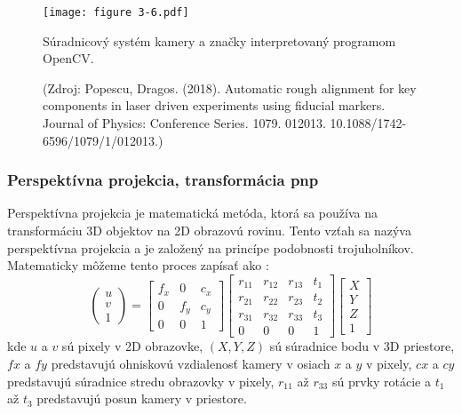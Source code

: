 {\begin{figure}[ht!]
    \centering
    \texttt{[image: figure 3-6.pdf]}
    \caption{Súradnicový systém kamery a značky interpretovaný programom OpenCV.}
    \captionsetup{font=footnotesize, justification=centering, skip=5pt}
    \caption*{(Zdroj: Popescu, Dragos. (2018). Automatic rough alignment for key components in laser driven experiments using fiducial markers. Journal of Physics: Conference Series. 1079. 012013. 10.1088/1742-6596/1079/1/012013.)}
    \label{o:3-6}
\end{figure}  

\subsubsection{Perspektívna projekcia, transformácia pnp}
Perspektívna projekcia je matematická metóda, ktorá sa používa na transformáciu 3D objektov na 2D obrazovú rovinu. Tento vzťah sa nazýva perspektívna projekcia a je založený na princípe podobnosti trojuholníkov. Matematicky môžeme tento proces zapísať ako \citep{9549863}:
\begin{equation}
    \begin{pmatrix} u \\ v \\ 1 \end{pmatrix} =
    \begin{bmatrix}
        f_x & 0 & c_x \\
        0 & f_y & c_y \\
        0 & 0 & 1
    \end{bmatrix}
    \begin{bmatrix}
        r_{11} & r_{12} & r_{13} & t_1 \\
        r_{21} & r_{22} & r_{23} & t_2 \\
        r_{31} & r_{32} & r_{33} & t_3 \\
        0 & 0 & 0 & 1
    \end{bmatrix}
    \begin{bmatrix}
        X \\ 
        Y \\
        Z \\
        1
    \end{bmatrix}
\end{equation}
kde $u$ a $v$ sú pixely v 2D obrazovke, $(X, Y, Z)$ sú súradnice bodu v 3D priestore, $fx$ a $fy$ predstavujú ohniskovú vzdialenosť kamery v osiach $x$ a $y$ v pixely, $cx$ a $cy$ predstavujú súradnice stredu obrazovky v pixely, $r_{11}$ až $r_{33}$ sú prvky rotácie a $t_1$ až $t_3$ predstavujú posun kamery v priestore.

}
